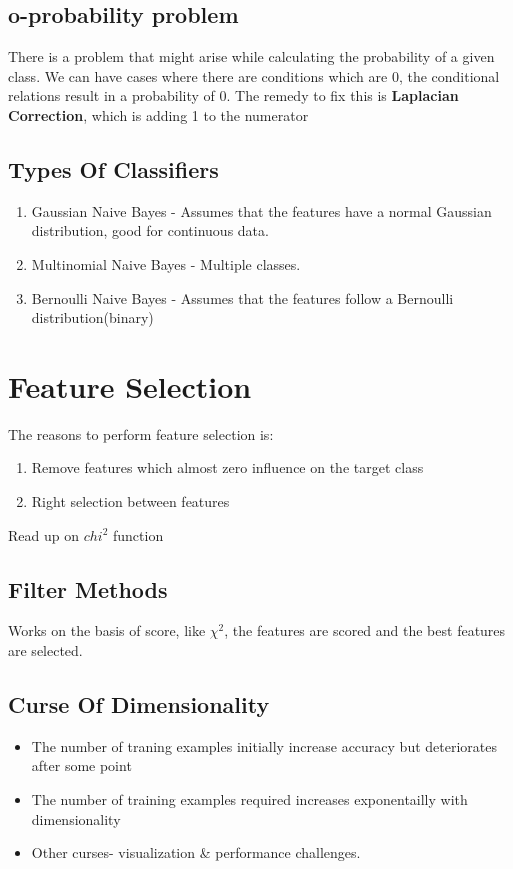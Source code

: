 \documentclass[11pt]{article}
\begin{document}
\subsection{o-probability problem}
\label{sec:org3eb7339}
There is a problem that might arise while calculating the probability of a given class.
We can have cases where there are conditions which are 0, the conditional relations result in a probability of 0. The remedy to fix this is \textbf{Laplacian Correction}, which is adding 1 to the numerator
\subsection{Types Of Classifiers}
\label{sec:orgd1ebbbe}
\begin{enumerate}
\item Gaussian Naive Bayes - Assumes that the features have a normal Gaussian distribution, good for continuous data.
\item Multinomial Naive Bayes - Multiple classes.
\item Bernoulli Naive Bayes - Assumes that the features follow a Bernoulli distribution(binary)
\end{enumerate}
\section{Feature Selection}
\label{sec:orga1734ec}
The reasons to perform feature selection is:
\begin{enumerate}
\item Remove features which almost zero influence on the target class
\item Right selection between features
\end{enumerate}

Read up on \(chi^2\) function
\subsection{Filter Methods}
\label{sec:org698060f}
Works on the basis of score, like \(\chi^{2}\), the features are scored and the best features are selected.
\subsection{Curse Of Dimensionality}
\label{sec:org20b7fa0}
\begin{itemize}
\item The number of traning examples initially increase accuracy but deteriorates after some point
\item The number of training examples required increases exponentailly with dimensionality
\item Other curses- visualization \& performance challenges.
\end{itemize}
\end{document}

